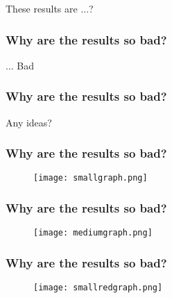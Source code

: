 \begin{frame}
\LARGE These results are ...?
\end{frame}

\begin{frame}
\frametitle{Why are the results so bad?}
\LARGE ... Bad
\end{frame}
\begin{frame}
\frametitle{Why are the results so bad?}
\LARGE Any ideas?
\end{frame}

\begin{frame}
\frametitle{Why are the results so bad?}
\begin{figure}

	\texttt{[image: smallgraph.png]}

\end{figure}
\end{frame}

\begin{frame}
\frametitle{Why are the results so bad?}
\begin{figure}

	\texttt{[image: mediumgraph.png]}

\end{figure}
\end{frame}

\begin{frame}
\frametitle{Why are the results so bad?}
\begin{figure}

	\texttt{[image: smallredgraph.png]}

\end{figure}
\end{frame}

